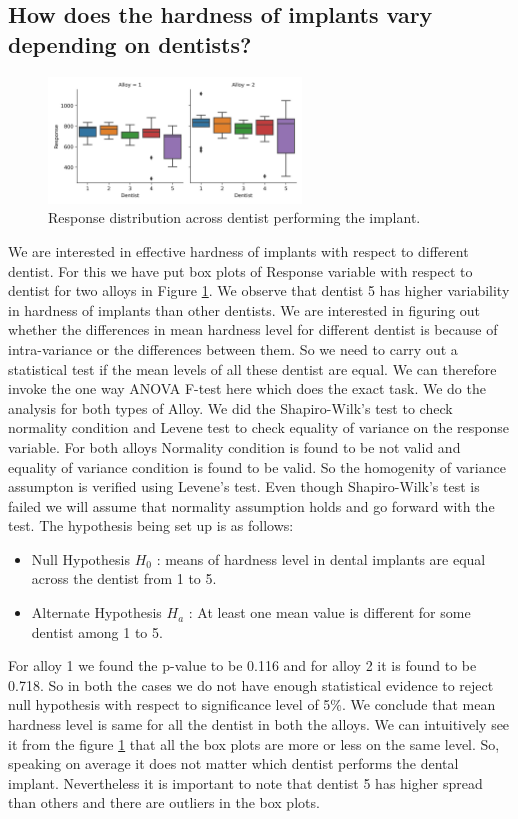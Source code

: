 \documentclass[12pt,a4paper]{style}
\begin{document}
	\subsection{How does the hardness of implants vary depending on dentists?}
		\begin{figure}
		\vspace{-1mm} %
		\includegraphics[width=0.6\textwidth]{4_1.png}
		\vspace{-6mm} %
		\caption{Response distribution across dentist performing the implant.}
		\label{fig:4.1}
	\end{figure}
	We are interested in effective hardness of implants with respect to different dentist. For this we have put box plots of Response variable with respect to dentist for two alloys in Figure \ref{fig:4.1}. We observe that dentist 5 has higher variability in hardness of implants than other dentists. We are interested in figuring out whether the differences in mean hardness level for different dentist is because of intra-variance or the differences between them. So we need to carry out a statistical test if the mean levels of all these dentist are equal. We can therefore invoke the one way ANOVA F-test here which does the exact task. We do the analysis for both types of Alloy. We did the Shapiro-Wilk's test to check normality condition and Levene test to check equality of variance on the response variable. For both alloys Normality condition is found to be not valid and equality of variance condition is found to be valid. So the homogenity of variance assumpton is verified using Levene's test. Even though Shapiro-Wilk's test is failed we will assume that normality assumption holds and go forward with the test. The hypothesis being set up is as follows:
	\begin{itemize}
		\item Null Hypothesis $H_0$ : means of hardness level in dental implants are equal across the dentist from 1 to 5.
		\item Alternate Hypothesis $H_a$ : At least one mean value is different for some dentist among 1 to 5.
	\end{itemize}   
		For alloy 1 we found the p-value to be 0.116 and for alloy 2 it is found to be 0.718. So in both the cases we do not have enough statistical evidence to reject null hypothesis with respect to 	significance level of 5\%. We conclude that mean hardness level is same for all the dentist in both the alloys. We can intuitively see it from the figure \ref{fig:4.1} that all the box plots are more or less on the same level. So, speaking on average it does not matter which dentist performs the dental implant. Nevertheless it is important to note that dentist 5 has higher spread than others and there are outliers in the box plots. 
\end{document}
